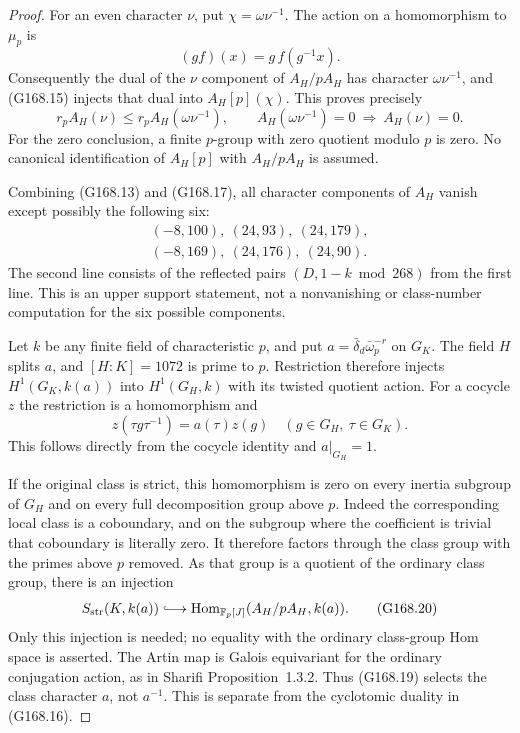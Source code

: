 \begin{proof}
For an even character $\nu$, put $\chi=\omega\nu^{-1}$.
The action on a homomorphism to $\mu_p$ is
\[
                    (g f)(x)=g\,f(g^{-1}x).
 \tag{G168.16}
\]
Consequently the dual of the $\nu$ component of $A_H/pA_H$
has character $\omega\nu^{-1}$, and (G168.15) injects that
dual into $A_H[p](\chi)$.
This proves precisely
\[
 r_p A_H(\nu)\leq r_p A_H(\omega\nu^{-1}),\qquad
 A_H(\omega\nu^{-1})=0\ \Longrightarrow\ A_H(\nu)=0.
 \tag{G168.17}
\]
For the zero conclusion, a finite $p$-group with zero quotient
modulo $p$ is zero.  No canonical identification of $A_H[p]$
with $A_H/pA_H$ is assumed.

Combining (G168.13) and (G168.17), all character components
of $A_H$ vanish except possibly the following six:
\[
 \begin{gathered}
 (-8,100),\ (24,93),\ (24,179),\\
 (-8,169),\ (24,176),\ (24,90).
 \end{gathered}
 \tag{G168.18}
\]
The second line consists of the reflected pairs
$(D,1-k\bmod268)$ from the first line.
This is an upper support statement, not a nonvanishing or
class-number computation for the six possible components.

Let $k$ be any finite field of characteristic $p$, and put
$a=\bar\delta_d\bar\omega_p^{-r}$ on $G_K$.
The field $H$ splits $a$, and $[H:K]=1072$ is prime to $p$.
Restriction therefore injects $H^1(G_K,k(a))$ into
$H^1(G_H,k)$ with its twisted quotient action.
For a cocycle $z$ the restriction is a homomorphism and
\[
             z(\tau g\tau^{-1})=a(\tau)z(g)
                       \quad(g\in G_H,\ \tau\in G_K).
 \tag{G168.19}
\]
This follows directly from the cocycle identity and $a|_{G_H}=1$.

If the original class is strict, this homomorphism is zero
on every inertia subgroup of $G_H$ and on every full
decomposition group above $p$.
Indeed the corresponding local class is a coboundary, and
on the subgroup where the coefficient is trivial that
coboundary is literally zero.
It therefore factors through the class group with the primes
above $p$ removed.  As that group is a quotient of the ordinary
class group, there is an injection
\[
 S_{\rm str}(K,k(a))\lhook\joinrel\longrightarrow
        \operatorname{Hom}_{\mathbb F_p[J]}
                        (A_H/pA_H,k(a)).
 \tag{G168.20}
\]
Only this injection is needed; no equality with the ordinary
class-group Hom space is asserted.
The Artin map is Galois equivariant for the ordinary conjugation
action, as in Sharifi Proposition~1.3.2.
Thus (G168.19) selects the class character $a$, not $a^{-1}$.
This is separate from the cyclotomic duality in (G168.16).


\end{proof}
